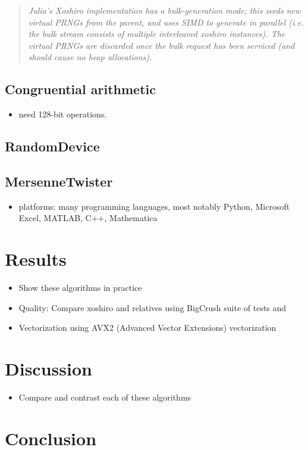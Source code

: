 \documentclass{article}
\begin{document}
            \begin{quote}
                \textit{Julia's Xoshiro implementation has a bulk-generation mode; this seeds new virtual PRNGs from the parent, and uses SIMD to generate in parallel (i.e. the bulk stream consists of multiple interleaved xoshiro instances). The virtual PRNGs are discarded once the bulk request has been serviced (and should cause no heap allocations).}
            \end{quote}

        \subsection*{Congruential arithmetic}

            \begin{itemize}
                \item need 128-bit operations.
            \end{itemize}

        \subsection*{RandomDevice}
        
        \subsection*{MersenneTwister}

            \begin{itemize}
                \item platforms: many programming languages, most notably Python\cite{Python}, Microsoft Excel\cite{Excel}, MATLAB\cite{MATLAB}, C++\cite{Cpp}, Mathematica\cite{Mathematica}
            \end{itemize}

    \section*{Results}

        \begin{itemize}
            \item Show these algorithms in practice
            \item Quality\cite{Shootout}: Compare xoshiro and relatives using BigCrush suite of tests\cite{TestU01} and\cite{HammingWeightDependencies}
            \item Vectorization using AVX2 (Advanced Vector Extensions) vectorization\cite{Shootout}
        \end{itemize}

    \section*{Discussion}

        \begin{itemize}
            \item Compare and contrast each of these algorithms
        \end{itemize}

    \section*{Conclusion}

    \printbibliography
\end{document}

